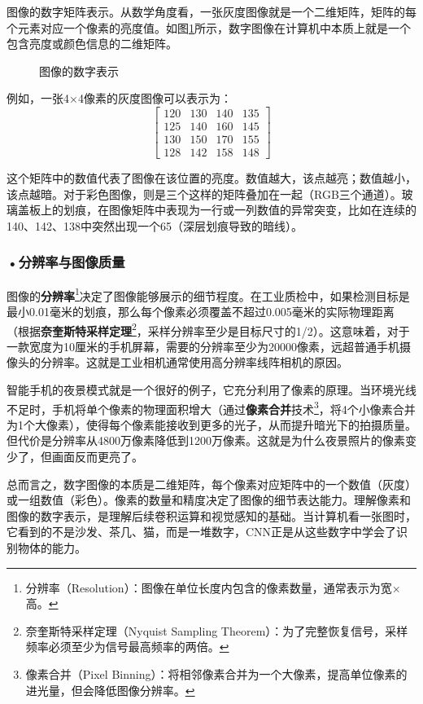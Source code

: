 图像的数字矩阵表示。从数学角度看，一张灰度图像就是一个二维矩阵，矩阵的每个元素对应一个像素的亮度值。如图\ref{fig:ch2_2_13}所示，数字图像在计算机中本质上就是一个包含亮度或颜色信息的二维矩阵。

\begin{figure}[H]
\centering
{}
\caption{图像的数字表示}
\label{fig:ch2_2_13}
\end{figure}例如，一张4×4像素的灰度图像可以表示为：
\[
\begin{bmatrix}
120 & 130 & 140 & 135 \\
125 & 140 & 160 & 145 \\
130 & 150 & 170 & 155 \\
128 & 142 & 158 & 148
\end{bmatrix}
\]

这个矩阵中的数值代表了图像在该位置的亮度。数值越大，该点越亮；数值越小，该点越暗。对于彩色图像，则是三个这样的矩阵叠加在一起（RGB三个通道）。玻璃盖板上的划痕，在图像矩阵中表现为一行或一列数值的异常突变，比如在连续的140、142、138中突然出现一个65（深层划痕导致的暗线）。

\subsubsection*{\textbf{•分辨率与图像质量}}

 图像的\textbf{分辨率}\footnote{分辨率（Resolution）：图像在单位长度内包含的像素数量，通常表示为宽×高。}决定了图像能够展示的细节程度。在工业质检中，如果检测目标是最小0.01毫米的划痕，那么每个像素必须覆盖不超过0.005毫米的实际物理距离（根据\textbf{奈奎斯特采样定理}\footnote{奈奎斯特采样定理（Nyquist Sampling Theorem）：为了完整恢复信号，采样频率必须至少为信号最高频率的两倍。}，采样分辨率至少是目标尺寸的1/2）。这意味着，对于一款宽度为10厘米的手机屏幕，需要的分辨率至少为20000像素，远超普通手机摄像头的分辨率。这就是工业相机通常使用高分辨率线阵相机的原因。

智能手机的夜景模式就是一个很好的例子，它充分利用了像素的原理。当环境光线不足时，手机将单个像素的物理面积增大（通过\textbf{像素合并}技术\footnote{像素合并（Pixel Binning）：将相邻像素合并为一个大像素，提高单位像素的进光量，但会降低图像分辨率。}，将4个小像素合并为1个大像素），使得每个像素能接收到更多的光子，从而提升暗光下的拍摄质量。但代价是分辨率从4800万像素降低到1200万像素。这就是为什么夜景照片的像素变少了，但画面反而更亮了。

总而言之，数字图像的本质是二维矩阵，每个像素对应矩阵中的一个数值（灰度）或一组数值（彩色）。像素的数量和精度决定了图像的细节表达能力。理解像素和图像的数字表示，是理解后续卷积运算和视觉感知的基础。当计算机看一张图时，它看到的不是沙发、茶几、猫，而是一堆数字，CNN正是从这些数字中学会了识别物体的能力。






